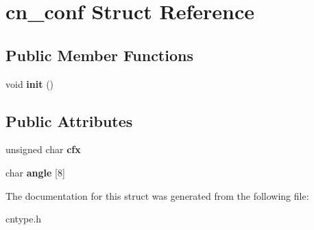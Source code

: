 \hypertarget{structcn__conf}{\section{cn\-\_\-conf Struct Reference}
\label{structcn__conf}
}
\subsection*{Public Member Functions}
\begin{DoxyCompactItemize}
\item 
\hypertarget{structcn__conf_a09d5a907e8dd4a26e99b4a9754b363d3}{void {\bfseries init} ()}\label{structcn__conf_a09d5a907e8dd4a26e99b4a9754b363d3}

\end{DoxyCompactItemize}
\subsection*{Public Attributes}
\begin{DoxyCompactItemize}
\item 
\hypertarget{structcn__conf_ab777d2a73a04f43fe5a6d15204f7189b}{unsigned char {\bfseries cfx}}\label{structcn__conf_ab777d2a73a04f43fe5a6d15204f7189b}

\item 
\hypertarget{structcn__conf_aeaec3f19c580b56176ecb982782bcf16}{char {\bfseries angle} \mbox{[}8\mbox{]}}\label{structcn__conf_aeaec3f19c580b56176ecb982782bcf16}

\end{DoxyCompactItemize}


The documentation for this struct was generated from the following file\-:\begin{DoxyCompactItemize}
\item 
cntype.\-h\end{DoxyCompactItemize}
